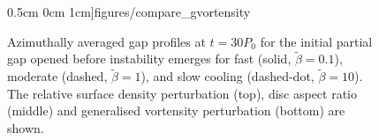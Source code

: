 \begin{figure}
    0.5cm 0cm 1cm]{figures/compare_gvortensity}
  \caption{Azimuthally averaged gap profiles at $t=30P_0$ for the
    initial partial gap opened before instability emerges for fast
    (solid, $\tilde{\beta}=0.1$), moderate
    (dashed,  $\tilde{\beta}=1$), and slow cooling (dashed-dot,
    $\tilde{\beta}=10$). The relative surface density 
    perturbation (top), disc aspect ratio (middle) and generalised
    vortensity perturbation (bottom) are shown. \label{intial1D}}  
\end{figure}




